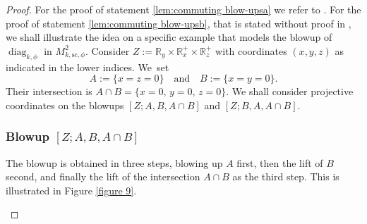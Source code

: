 \documentclass[JEP,XML,SOM,Unicode,NoFloatCountersInSection,published]{cedram}
\theoremstyle{plain}
\theoremstyle{definition}
\newcommand{\R}{{\mathbb{R}}}
\newcommand{\ssc}{{\mathrm{sc}}}
\DeclareMathOperator\diag{diag}
\begin{document}
\begin{proof}
For the proof of statement \eqref{lem:commuting blow-upsa} we refer to \cite[Lem.\,2.1]{analytic-surgery}.
For the proof of statement \eqref{lem:commuting blow-upsb}, that is stated without proof in \cite[Prop.\,5]{Mel-real}, we shall illustrate the idea on a specific example
that models the blowup of $\diag_{k,\phi}$ in $M^2_{k,\ssc,\phi}$. Consider $Z:=\R_y \times \R^+_x \times \R^+_z$
with coordinates $(x,y,z)$ as indicated in the lower indices.
We~set
\[
A:= \{x=z=0\} \quad \text{and} \quad B:= \{x=y=0\}.
\]
Their intersection is $A\cap B = \{x=0,\, y=0,\, z=0\}$. We shall consider projective
coordinates on the blowups $[Z; A, B, A \cap B]$ and $[Z; B, A, A \cap B]$.

\subsubsection*{Blowup $[Z; A, B, A \cap B]$}
The blowup is obtained in three steps, blowing up $A$ first,
then the lift of $B$ second, and finally the lift of the intersection $A\cap B$
as the third step. This is illustrated in Figure \ref{figure 9}.

\begin{figure}[htb]

\end{figure}
\end{proof}
\end{document}
